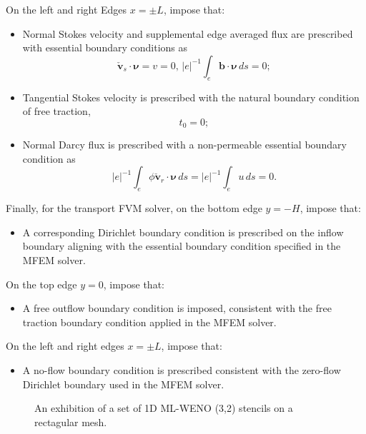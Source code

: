 On the  left and right Edges $x=\pm L$, impose that:
					 \begin{itemize}
								\item Normal Stokes velocity and supplemental edge averaged flux are prescribed with essential boundary conditions as
						  \begin{equation*}
									 \check{\mathbf{v}}_s \cdot \pmb{\nu} = v = 0,\, \lvert e \rvert^{-1}\int_e \mathbf{b}\cdot \pmb{\nu}\, ds = 0;
						  \end{equation*}
				\item Tangential Stokes velocity is prescribed with the natural boundary condition of free traction,
						  \begin{equation*}
									 t_0 = 0;
						  \end{equation*}
								\item Normal Darcy flux is prescribed with a non-permeable essential boundary condition as
										  \begin{equation*}
													 \lvert e \rvert^{-1} \int_e \phi\check{\mathbf{v}}_r\cdot \pmb{\nu}\, ds = \lvert e \rvert^{-1} \int_e u\, ds = 0.
										  \end{equation*}
					 \end{itemize}

\noindent Finally, for the transport FVM solver, on the 
		  bottom edge $y = -H$, impose that:
		  \begin{itemize}
		  \item A corresponding Dirichlet boundary condition is prescribed on the inflow boundary 
		  aligning with the essential boundary
		  condition specified in the MFEM solver.
		  \end{itemize}
        On the top edge $y=0$, impose that:
		  \begin{itemize}
		  \item A free outflow boundary condition is imposed, consistent with the free traction boundary condition applied in the MFEM solver.
		  \end{itemize}
        On the left and right edges $x = \pm L$, impose that:
		  \begin{itemize}
        \item A no-flow boundary condition is prescribed consistent with the zero-flow Dirichlet boundary used in the MFEM solver.
		  \end{itemize}

\begin{figure}[htb]
\centering

		  \caption{An exhibition of a set of 1D ML-WENO (3,2) stencils on a 
		  rectagular mesh.}
\label{fig:1dsten}
\end{figure}

